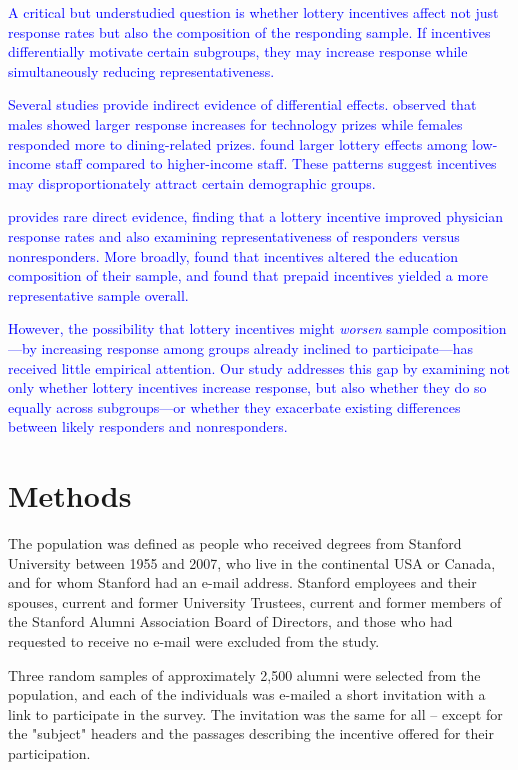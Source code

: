 \documentclass[12pt]{article}
\begin{document}
\textcolor{blue}{A critical but understudied question is whether lottery incentives affect not just response rates but also the composition of the responding sample. If incentives differentially motivate certain subgroups, they may increase response while simultaneously reducing representativeness.}

\textcolor{blue}{Several studies provide indirect evidence of differential effects. \citet{laguilles2011} observed that males showed larger response increases for technology prizes while females responded more to dining-related prizes. \citet{zhang2017} found larger lottery effects among low-income staff compared to higher-income staff. These patterns suggest incentives may disproportionately attract certain demographic groups.}

\textcolor{blue}{\citet{robertson2005} provides rare direct evidence, finding that a lottery incentive improved physician response rates and also examining representativeness of responders versus nonresponders. More broadly, \citet{petrolia2009} found that incentives altered the education composition of their sample, and \citet{goyder1994} found that prepaid incentives yielded a more representative sample overall.}

\textcolor{blue}{However, the possibility that lottery incentives might \textit{worsen} sample composition---by increasing response among groups already inclined to participate---has received little empirical attention. Our study addresses this gap by examining not only whether lottery incentives increase response, but also whether they do so equally across subgroups---or whether they exacerbate existing differences between likely responders and nonresponders.}

\section{Methods}

The population was defined as people who received degrees from Stanford University between 1955 and 2007, who live in the continental USA or Canada, and for whom Stanford had an e-mail address.  Stanford employees and their spouses, current and former University Trustees, current and former members of the Stanford Alumni Association Board of Directors, and those who had requested to receive no e-mail were excluded from the study.

Three random samples of approximately 2,500 alumni were selected from the population, and each of the individuals was e-mailed a short invitation with a link to participate in the survey.  The invitation was the same for all – except for the "subject" headers and the passages describing the incentive offered for their participation.
\end{document}
